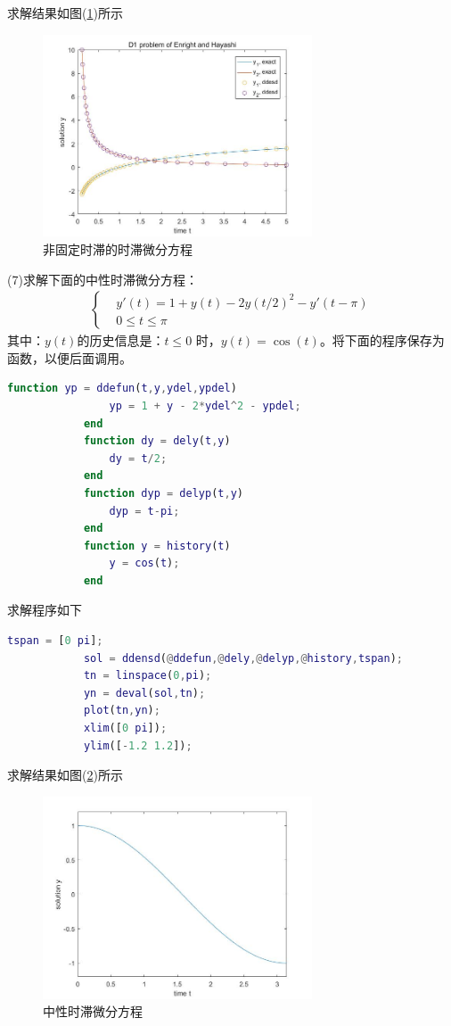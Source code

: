 	        求解结果如图(\ref{非固定时滞的时滞微分方程})所示
			\begin{figure}[H]
	        \centering
	        \includegraphics[width=8cm]{images/DDEfeigudingyanchi.jpg}
	        \caption{非固定时滞的时滞微分方程}
	        \label{非固定时滞的时滞微分方程}
	        \end{figure}
	        (7)求解下面的中性时滞微分方程：
	        \begin{align*}
			\left\{
			\begin{aligned}
			& y'(t)=1+y(t)-2y(t/2)^2-y'(t-\pi)\\
			& 0\leq t \leq \pi
			\end{aligned}
			\right.
	        \end{align*}
	        其中：$y(t)$的历史信息是：$t \leqslant 0$ 时，$y(t) = \cos (t)$。将下面的程序保存为函数，以便后面调用。
	        \begin{lstlisting}[language = Matlab]
		 	function yp = ddefun(t,y,ydel,ypdel)
		        yp = 1 + y - 2*ydel^2 - ypdel;
		    end
		    function dy = dely(t,y)
		        dy = t/2;
		    end
		    function dyp = delyp(t,y)
		        dyp = t-pi;
		    end
		    function y = history(t)
		        y = cos(t);
		    end
	        \end{lstlisting}
	        求解程序如下
	        \begin{lstlisting}[language = Matlab]
			tspan = [0 pi];
			sol = ddensd(@ddefun,@dely,@delyp,@history,tspan);
			tn = linspace(0,pi);
			yn = deval(sol,tn);
			plot(tn,yn);
			xlim([0 pi]);
			ylim([-1.2 1.2]);
	        \end{lstlisting}
	        求解结果如图(\ref{中性时滞微分方程})所示
			\begin{figure}[H]
	        \centering
	        \includegraphics[width=8cm]{images/zhongxingDDE.jpg}
	        \caption{中性时滞微分方程}
	        \label{中性时滞微分方程}
	        \end{figure}

